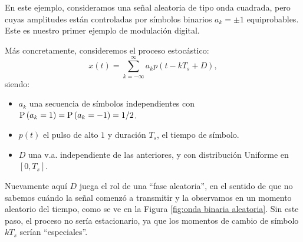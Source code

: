 \begin{ejemplo}\label{ej:onda binaria aleatoria}

    En este ejemplo, consideramos una señal aleatoria de tipo onda cuadrada, pero cuyas amplitudes están controladas por símbolos binarios $a_k=\pm 1$ equiprobables. Este es nuestro primer ejemplo de modulación digital.
    
    Más concretamente, consideremos el proceso estocástico:
    \begin{equation*}
        x(t) = \sum_{k=-\infty}^\infty a_k p(t-kT_s + D),
    \end{equation*}
    siendo:
    \begin{itemize}
        \item $a_k$ una secuencia de símbolos independientes con $\mathrm{P}\left(a_k=1\right)=\mathrm{P}\left(a_k=-1\right)=1/2$.
        \item $p(t)$ el pulso de alto $1$ y duración $T_s$, el tiempo de símbolo.
        \item $D$ una v.a. independiente de las anteriores, y con distribución Uniforme en $[0,T_s]$.
    \end{itemize}
    Nuevamente aquí $D$ juega el rol de una ``fase aleatoria'', en el sentido de que no sabemos cuándo la señal comenzó a transmitir y la observamos en un momento aleatorio del tiempo, como se ve en la Figura \ref{fig:onda binaria aleatoria}. Sin este paso, el proceso no sería estacionario, ya que los momentos de cambio de símbolo $kT_s$ serían ``especiales''.

    \begin{figure}
        \begin{center}
             \hspace{1cm}
\end{center}
\end{figure}
\end{ejemplo}
